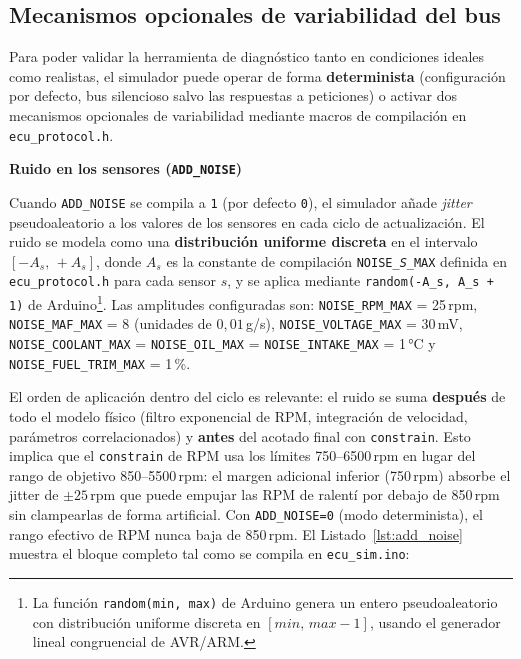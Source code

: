 \subsection{Mecanismos opcionales de variabilidad del bus}
\label{sec:ruido_can}

Para poder validar la herramienta de diagnóstico tanto en condiciones ideales como realistas, el simulador puede operar de forma \textbf{determinista} (configuración por defecto, bus silencioso salvo las respuestas a peticiones) o activar dos mecanismos opcionales de variabilidad mediante macros de compilación en \texttt{ecu\_protocol.h}.

\medskip
\noindent\textbf{Ruido en los sensores (\texttt{ADD\_NOISE})}

Cuando \texttt{ADD\_NOISE} se compila a \texttt{1} (por defecto \texttt{0}), el simulador añade \textit{jitter} pseudoaleatorio a los valores de los sensores en cada ciclo de actualización. El ruido se modela como una \textbf{distribución uniforme discreta} en el intervalo $[-A_s,\, +A_s]$, donde $A_s$ es la constante de compilación \texttt{NOISE\_\textit{S}\_MAX} definida en \texttt{ecu\_protocol.h} para cada sensor $s$, y se aplica mediante \texttt{random(-A\_s, A\_s + 1)} de Arduino\footnote{La función \texttt{random(min, max)} de Arduino genera un entero pseudoaleatorio con distribución uniforme discreta en $[\mathit{min},\, \mathit{max}-1]$, usando el generador lineal congruencial de AVR/ARM.}. Las amplitudes configuradas son: \texttt{NOISE\_RPM\_MAX} = 25\,rpm, \texttt{NOISE\_MAF\_MAX} = 8 (unidades de $0{,}01$\,g/s), \texttt{NOISE\_VOLTAGE\_MAX} = 30\,mV, \texttt{NOISE\_COOLANT\_MAX} = \texttt{NOISE\_OIL\_MAX} = \texttt{NOISE\_INTAKE\_MAX} = 1\,°C y \texttt{NOISE\_FUEL\_TRIM\_MAX} = 1\,\%.

El orden de aplicación dentro del ciclo es relevante: el ruido se suma \textbf{después} de todo el modelo físico (filtro exponencial de RPM, integración de velocidad, parámetros correlacionados) y \textbf{antes} del acotado final con \texttt{constrain}. Esto implica que el \texttt{constrain} de RPM usa los límites 750--6500\,rpm en lugar del rango de objetivo 850--5500\,rpm: el margen adicional inferior (750\,rpm) absorbe el jitter de $\pm25$\,rpm que puede empujar las RPM de ralentí por debajo de 850\,rpm sin clampearlas de forma artificial. Con \texttt{ADD\_NOISE=0} (modo determinista), el rango efectivo de RPM nunca baja de 850\,rpm. El Listado~\ref{lst:add_noise} muestra el bloque completo tal como se compila en \texttt{ecu\_sim.ino}:

